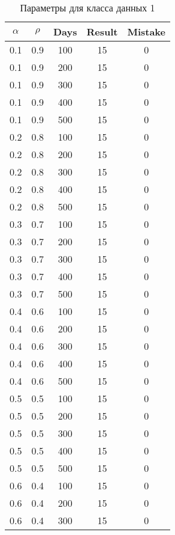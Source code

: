 \begin{center}
    \captionsetup{justification=raggedright,singlelinecheck=off}
    \begin{longtable}[c]{|c|c|c|c|c|}
    \caption{Параметры для класса данных 1\label{tbl:table_kd1}}\\ \hline
        $\alpha$ & $\rho$ & Days & Result & Mistake \\ \hline
 0.1 &  0.9 &  100 &    15 &     0 \\
 0.1 &  0.9 &  200 &    15 &     0 \\
 0.1 &  0.9 &  300 &    15 &     0 \\
 0.1 &  0.9 &  400 &    15 &     0 \\
 0.1 &  0.9 &  500 &    15 &     0 \\
\hline
 0.2 &  0.8 &  100 &    15 &     0 \\
 0.2 &  0.8 &  200 &    15 &     0 \\
 0.2 &  0.8 &  300 &    15 &     0 \\
 0.2 &  0.8 &  400 &    15 &     0 \\
 0.2 &  0.8 &  500 &    15 &     0 \\
\hline
 0.3 &  0.7 &  100 &    15 &     0 \\
 0.3 &  0.7 &  200 &    15 &     0 \\
 0.3 &  0.7 &  300 &    15 &     0 \\
 0.3 &  0.7 &  400 &    15 &     0 \\
 0.3 &  0.7 &  500 &    15 &     0 \\
\hline
 0.4 &  0.6 &  100 &    15 &     0 \\
 0.4 &  0.6 &  200 &    15 &     0 \\
 0.4 &  0.6 &  300 &    15 &     0 \\
 0.4 &  0.6 &  400 &    15 &     0 \\
 0.4 &  0.6 &  500 &    15 &     0 \\
\hline
 0.5 &  0.5 &  100 &    15 &     0 \\
 0.5 &  0.5 &  200 &    15 &     0 \\
 0.5 &  0.5 &  300 &    15 &     0 \\
 0.5 &  0.5 &  400 &    15 &     0 \\
 0.5 &  0.5 &  500 &    15 &     0 \\
\hline
 0.6 &  0.4 &  100 &    15 &     0 \\
 0.6 &  0.4 &  200 &    15 &     0 \\
 0.6 &  0.4 &  300 &    15 &     0 \\

\end{longtable}
\end{center}
